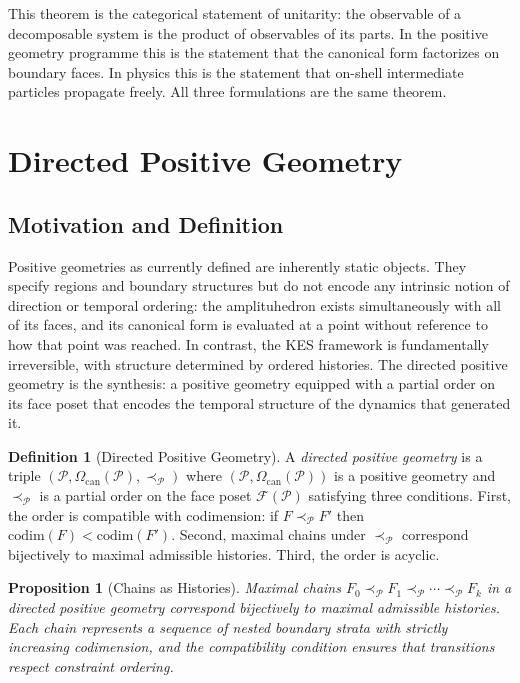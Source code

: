 \documentclass[12pt, oneside]{amsart}
\theoremstyle{plain}
\newtheorem{proposition}[theorem]{Proposition}
\theoremstyle{definition}
\newtheorem{definition}[theorem]{Definition}
\theoremstyle{remark}
\newcommand{\CF}{\Omega_{\mathrm{can}}}
\begin{document}
This theorem is the categorical statement of unitarity: the observable of a decomposable system is the product of observables of its parts. In the positive geometry programme this is the statement that the canonical form factorizes on boundary faces. In physics this is the statement that on-shell intermediate particles propagate freely. All three formulations are the same theorem.

\section{Directed Positive Geometry}
\label{sec:directed}

\subsection{Motivation and Definition}

Positive geometries as currently defined are inherently static objects. They specify regions and boundary structures but do not encode any intrinsic notion of direction or temporal ordering: the amplituhedron exists simultaneously with all of its faces, and its canonical form is evaluated at a point without reference to how that point was reached. In contrast, the KES framework is fundamentally irreversible, with structure determined by ordered histories. The directed positive geometry is the synthesis: a positive geometry equipped with a partial order on its face poset that encodes the temporal structure of the dynamics that generated it.

\begin{definition}[Directed Positive Geometry]
\label{def:dpg}
A \emph{directed positive geometry} is a triple $(\mathcal{P}, \CF(\mathcal{P}), \prec_{\mathcal{P}})$ where $(\mathcal{P}, \CF(\mathcal{P}))$ is a positive geometry and $\prec_{\mathcal{P}}$ is a partial order on the face poset $\mathcal{F}(\mathcal{P})$ satisfying three conditions. First, the order is compatible with codimension: if $F \prec_{\mathcal{P}} F'$ then $\mathrm{codim}(F) < \mathrm{codim}(F')$. Second, maximal chains under $\prec_{\mathcal{P}}$ correspond bijectively to maximal admissible histories. Third, the order is acyclic.
\end{definition}

\begin{proposition}[Chains as Histories]
Maximal chains $F_0 \prec_{\mathcal{P}} F_1 \prec_{\mathcal{P}} \cdots \prec_{\mathcal{P}} F_k$ in a directed positive geometry correspond bijectively to maximal admissible histories. Each chain represents a sequence of nested boundary strata with strictly increasing codimension, and the compatibility condition ensures that transitions respect constraint ordering.
\end{proposition}
\end{document}
